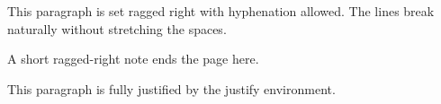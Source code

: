 \documentclass{article}
\begin{document}
\begin{FlushLeft}
This paragraph is set ragged right with hyphenation allowed.
The lines break naturally without stretching the spaces.
\end{FlushLeft}
{\RaggedRight A short ragged-right note ends the page here.}
\begin{justify}
This paragraph is fully justified by the justify environment.
\end{justify}
\end{document}
